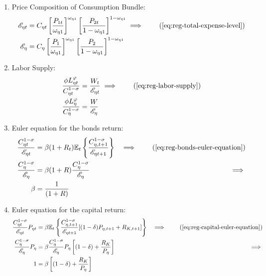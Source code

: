 \documentclass[
thesis.tex
]{subfiles}
\begin{document}
\begin{enumerate}
\begin{comment}
	\item Relative Consumption of Regional Goods:
	\begin{align}
		\frac{C_{\eta 1 t}}{C_{\eta 2 t}} &= \frac{P_{\nu t}}{P_{\eta t}} \cdot \frac{\omega_{\eta 1}}{1 -\omega_{\eta 1}} \implies \tag{\ref{eq:reg-FOC-C1-C2}}\\
		\frac{C_{\eta 1}}{C_{\eta 2}} &= \frac{P_{\nu}}{P_{\eta}} \cdot \frac{\omega_{\eta 1}}{1 -\omega_{\eta 1}} \label{eq:reg-ss-FOC-C1-C2}
	\end{align}
	
\end{comment}

	\item Price Composition of Consumption Bundle:
	\begin{align}
		\te &= C_{\eta t} \left[ \frac{P_{1 t}}{\omega_{\eta 1}} \right]^{\omega_{\eta 1}} \left[ \frac{P_{2 t}}{1 -\omega_{\eta 1}} \right]^{1 -\omega_{\eta 1}} \implies \tag{\ref{eq:reg-total-expense-level}} 
		\\
		\te[] &= C_{\eta} \left[ \frac{P_{1}}{\omega_{\eta 1}} \right]^{\omega_{\eta 1}} \left[ \frac{P_{2}}{1 -\omega_{\eta 1}} \right]^{1 -\omega_{\eta 1}} \label{eq:reg-ss-price-eta-level}
	\end{align}

	\item Labor Supply:
	\begin{align}
		\frac{\phi L_{\eta t}^{\varphi}}{C_{\eta t}^{1-\sigma}} &= \frac{W_t}{\te} \implies \tag{\ref{eq:reg-labor-supply}} \\
		\frac{\phi L_{\eta}^{\varphi}}{C_{\eta}^{1-\sigma}} &= \frac{W}{\te[]} \label{eq:reg-ss-household-labor-supply}
	\end{align}

	\item Euler equation for the bonds return:
	\begin{alignat}{2}
		\frac{ C_{\eta t}^{1-\sigma}}{ \te} &= \beta (1 + R_{t}) \E \left\{ \frac{ C_{\eta, t+1}^{1-\sigma}}{ \te[t+1]} \right\} &\implies \tag{\ref{eq:reg-bonds-euler-equation}} 
		\\
		\frac{ C_{\eta}^{1-\sigma}}{ \te[]} &= \beta (1 + R) \frac{ C_{\eta}^{1-\sigma}}{ \te[]} &\implies \nonumber 
		\\
		\beta &= \frac{1}{(1 + R)} \label{eq:reg-ss-bonds-euler-equation}
	\end{alignat}

	\item Euler equation for the capital return:
	\begin{alignat}{2}
		\frac{ C_{\eta t}^{1-\sigma}}{ \te} P_{\eta t} &= \beta \mathbb{E}_t \left\{ \frac{ C_{\eta, t+1}^{1-\sigma}}{ \te[t+1]} [(1-\delta) P_{\eta, t+1} + R_{K,t+1}] \right\} &\implies \tag{\ref{eq:reg-capital-euler-equation}} \\
		\frac{ C_{\eta}^{1-\sigma}}{ \te[]} P_{\eta} &= \beta \frac{ C_{\eta}^{1-\sigma}}{ \te[]} P_{\eta} \left[ (1-\delta) + \frac{R_{K}}{P_{\eta}} \right] &\implies \nonumber \\
		1 &= \beta \left[ (1-\delta) + \frac{R_{K}}{P_{\eta}} \right] \label{eq:reg-ss-capital-euler-equation}
	\end{alignat}


\end{enumerate}
\end{document}
